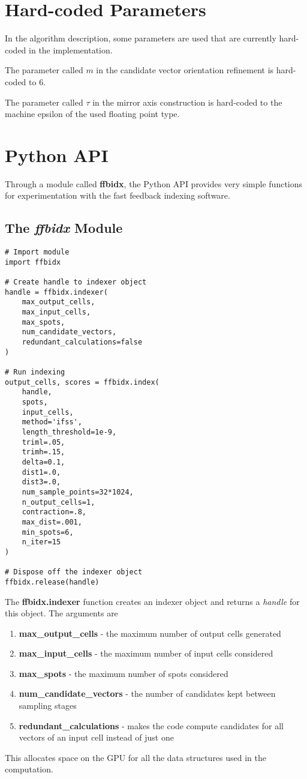 \documentclass[a4paper,10pt]{article}
\begin{document}
\section{Hard-coded Parameters}

In the algorithm description, some parameters are used that are currently hard-coded in the implementation.

The parameter called $m$ in the candidate vector orientation refinement is hard-coded to 6.

The parameter called $\tau$ in the mirror axis construction is hard-coded to the machine epsilon of the used floating point type.

\section{Python API}
\lstset{language=Python}

Through a module called \textbf{ffbidx}, the Python API provides very simple functions for experimentation with the fast feedback indexing software.

\subsection{The \emph{ffbidx} Module}

\begin{lstlisting}
# Import module
import ffbidx

# Create handle to indexer object
handle = ffbidx.indexer(
    max_output_cells,
    max_input_cells,
    max_spots,
    num_candidate_vectors,
    redundant_calculations=false
)

# Run indexing
output_cells, scores = ffbidx.index(
    handle,
    spots,
    input_cells,
    method='ifss',
    length_threshold=1e-9,
    triml=.05,
    trimh=.15,
    delta=0.1,
    dist1=.0,
    dist3=.0,
    num_sample_points=32*1024,
    n_output_cells=1,
    contraction=.8,
    max_dist=.001,
    min_spots=6,
    n_iter=15
)

# Dispose off the indexer object
ffbidx.release(handle)
\end{lstlisting}
%
The \textbf{ffbidx.indexer} function creates an indexer object and returns a \emph{handle} for this object. The arguments are
%
\begin{enumerate}
 \item \textbf{max\_output\_cells} - the maximum number of output cells generated
 \item \textbf{max\_input\_cells} - the maximum number of input cells considered
 \item \textbf{max\_spots} - the maximum number of spots considered
 \item \textbf{num\_candidate\_vectors} - the number of candidates kept between sampling stages
 \item \textbf{redundant\_calculations} - makes the code compute candidates for all vectors of an input cell instead of just one
\end{enumerate}
%
This allocates space on the GPU for all the data structures used in the computation.
\end{document}
